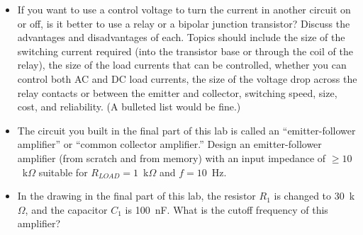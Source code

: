 \begin{itemize}

\item If you want to use a control voltage to turn the current in another circuit on or off, is it better to use a relay or a bipolar junction transistor?  Discuss the advantages and disadvantages of each.  Topics should include the size of the switching current required (into the transistor base or through the coil of the relay), the size of the load currents that can be controlled, whether you can control both AC and DC load currents, the size of the voltage drop across the relay contacts or between the emitter and collector, switching speed, size, cost, and reliability.  (A bulleted list would be fine.)

\item The circuit you built in the final part of this lab is called an ``emitter-follower amplifier'' or ``common collector amplifier.''  Design an emitter-follower amplifier (from scratch and from memory) with an input impedance of $\ge 10$~k$\Omega$ suitable for $R_{LOAD}=1$~k$\Omega$ and $f=10$~Hz.

\item In the drawing in the final part of this lab, the resistor $R_1$ is changed to 30~k$\Omega$, and the capacitor $C_1$ is 100~nF.  What is the cutoff frequency of this amplifier?

\end{itemize}







